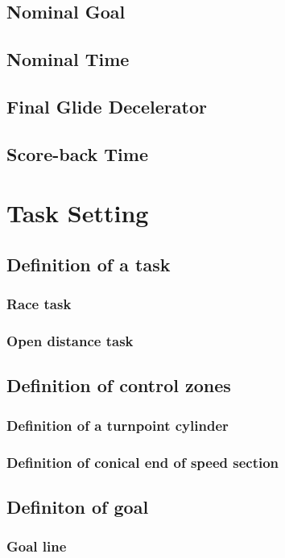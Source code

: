 \documentclass{article}
\begin{document}
\subsection{Nominal Goal}
\subsection{Nominal Time}
\subsection{Final Glide Decelerator}
\label{sec:final-glide-decelerators}
\subsection{Score-back Time}
\label{sec:score-back-time}

\newpage
\section{Task Setting}
\subsection{Definition of a task}
\subsubsection{Race task}
\subsubsection{Open distance task}
\subsection{Definition of control zones}
\subsubsection{Definition of a turnpoint cylinder}
\subsubsection{Definition of conical end of speed section}
\subsection{Definiton of goal}
\subsubsection{Goal line}
\end{document}
